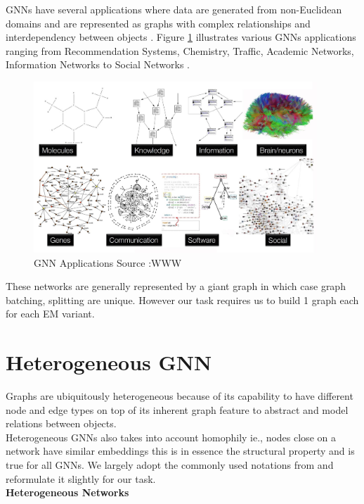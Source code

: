 \documentclass{report} %
\begin{document}
\ac{GNN}s have several applications where data are generated from non-Euclidean domains and are represented as graphs with complex relationships 
and interdependency between objects \cite{GNN-2019}. Figure \ref{fig:GNN Applications} illustrates various \ac{GNN}s applications ranging 
from Recommendation Systems, Chemistry, Traffic, Academic Networks, Information Networks to Social Networks \cite{HGNN-2020}.
\begin{figure}[H]
    \centering
    \includegraphics[width=0.95\textwidth]{./ReportImages/GraphApplications.png} 
    \caption{\ac{GNN} Applications Source :WWW}
    \label{fig:GNN Applications}
\end{figure}

These networks are generally represented by a giant graph in which case graph batching, splitting are unique.
However our task requires us to build 1 graph each for each \ac{EM} variant.

\section{Heterogeneous \ac{GNN}}\label{sec:Heterogeneous GNN}

Graphs are ubiquitously heterogeneous because of its capability to have different node and edge types on top of its inherent graph feature to abstract and model 
relations between objects.\\
Heterogeneous \ac{GNN}s also takes into account homophily ie., nodes close on a network have similar embeddings \cite{HGNN-2020} this is in essence the structural 
property and is true for all \ac{GNN}s. We largely adopt the commonly used notations from \cite{ML HGNN-2023} and reformulate it slightly for our task. \\

\textbf{Heterogeneous Networks}
\end{document}
